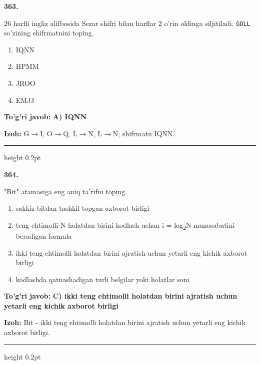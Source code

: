 \documentclass[10pt,a4paper,oneside]{article}
\begin{document}
\noindent\textbf{\color{ink}363.}
\par
26 harfli ingliz alifbosida Sezar shifri bilan harflar 2 o'rin oldinga siljitiladi. \texttt{GOLL} so'zining shifrmatnini toping.
\begin{enumerate}[label=\Alph*),leftmargin=9mm]
\item IQNN
\item HPMM
\item JROO
\item EMJJ
\end{enumerate}
\begin{tcolorbox}[enhanced,breakable,colback=teal!4,colframe=teal!50!black,boxrule=0.5pt,arc=1.1mm,left=3mm,right=3mm,top=1.7mm,bottom=1.7mm,before skip=2mm,after skip=2mm]
\textbf{\color{teal}To'g'ri javob:} \textbf{A) IQNN}
\par\smallskip
\textbf{Izoh:} G\ensuremath{\to}I, O\ensuremath{\to}Q, L\ensuremath{\to}N, L\ensuremath{\to}N; shifrmatn IQNN.
\end{tcolorbox}
\vspace{2mm}\hrule height 0.2pt \vspace{3mm}

\noindent\textbf{\color{ink}364.}
\par
"Bit" atamasiga eng aniq ta'rifni toping.
\begin{enumerate}[label=\Alph*),leftmargin=9mm]
\item sakkiz bitdan tashkil topgan axborot birligi
\item teng ehtimolli N holatdan birini kodlash uchun i = log\textsubscript{2}N munosabatini beradigan formula
\item ikki teng ehtimolli holatdan birini ajratish uchun yetarli eng kichik axborot birligi
\item kodlashda qatnashadigan turli belgilar yoki holatlar soni
\end{enumerate}
\begin{tcolorbox}[enhanced,breakable,colback=teal!4,colframe=teal!50!black,boxrule=0.5pt,arc=1.1mm,left=3mm,right=3mm,top=1.7mm,bottom=1.7mm,before skip=2mm,after skip=2mm]
\textbf{\color{teal}To'g'ri javob:} \textbf{C) ikki teng ehtimolli holatdan birini ajratish uchun yetarli eng kichik axborot birligi}
\par\smallskip
\textbf{Izoh:} Bit - ikki teng ehtimolli holatdan birini ajratish uchun yetarli eng kichik axborot birligi.
\end{tcolorbox}
\vspace{2mm}\hrule height 0.2pt \vspace{3mm}
\end{document}
